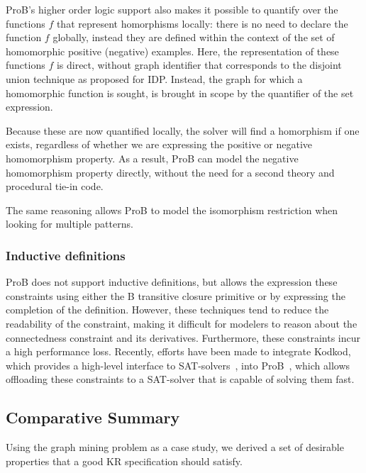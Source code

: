 ProB's higher order logic support also makes it possible to quantify over the functions $f$ that represent homorphisms locally: there is no need to declare the function $f$ globally, instead they are defined within the context of the set of homomorphic positive (negative) examples.
Here, the representation of these functions $f$ is direct, without graph identifier that corresponds to the disjoint union technique as proposed for IDP.
Instead, the graph  for which a homomorphic function is sought, is brought in scope by the quantifier of the set expression.

Because these are now quantified locally, the solver will find a homorphism if one exists, regardless of whether we are expressing the positive or negative homomorphism property.
As a result, ProB can model the negative homomorphism property directly, without the need for a second theory and procedural tie-in code.

The same reasoning allows ProB to model the isomorphism restriction when looking for multiple patterns.
\subsubsection{Inductive definitions}
ProB does not support inductive definitions, but allows the expression these constraints using either the B transitive closure primitive or by expressing the completion of the definition.
However, these techniques tend to reduce the readability of the constraint, making it difficult for modelers to reason about the connectedness constraint and its derivatives.
Furthermore, these constraints incur a high performance loss.
Recently, efforts have been made to integrate Kodkod, which provides a high-level interface to SAT-solvers~\citep{DBLP:conf/tacas/TorlakJ07}, into ProB~\citep{DBLP:conf/fm/PlaggeL12}, which allows offloading these constraints to a SAT-solver that is capable of solving them fast.


\subsection{Comparative Summary} %

Using the graph mining problem as a case study, we derived a set of desirable properties that a good KR specification should satisfy.

